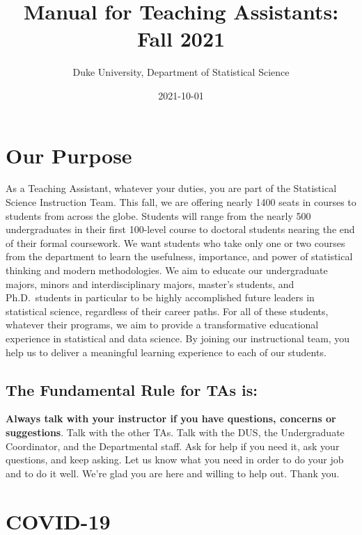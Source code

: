 \documentclass[
]{article}
\title{Manual for Teaching Assistants: Fall 2021}
\author{Duke University, Department of Statistical Science}
\date{2021-10-01}
\begin{document}
\maketitle

{
\setcounter{tocdepth}{2}
\tableofcontents
}
\hypertarget{our-purpose}{%
\section{Our Purpose}\label{our-purpose}}

As a Teaching Assistant, whatever your duties, you are part of the Statistical Science Instruction Team. This fall, we are offering nearly 1400 seats in courses to students from across the globe. Students will range from the nearly 500 undergraduates in their first 100-level course to doctoral students nearing the end of their formal coursework. We want students who take only one or two courses from the department to learn the usefulness, importance, and power of statistical thinking and modern methodologies. We aim to educate our undergraduate majors, minors and interdisciplinary majors, master's students, and Ph.D.~students in particular to be highly accomplished future leaders in statistical science, regardless of their career paths. For all of these students, whatever their programs, we aim to provide a transformative educational experience in statistical and data science. By joining our instructional team, you help us to deliver a meaningful learning experience to each of our students.

\hypertarget{the-fundamental-rule-for-tas-is}{%
\subsection{The Fundamental Rule for TAs is:}\label{the-fundamental-rule-for-tas-is}}

\textbf{Always talk with your instructor if you have questions, concerns or suggestions}. Talk with the other TAs. Talk with the DUS, the Undergraduate Coordinator, and the Departmental staff. Ask for help if you need it, ask your questions, and keep asking. Let us know what you need in order to do your job and to do it well. We're glad you are here and willing to help out. Thank you.

\hypertarget{covid-19}{%
\section{COVID-19}\label{covid-19}}
\end{document}
